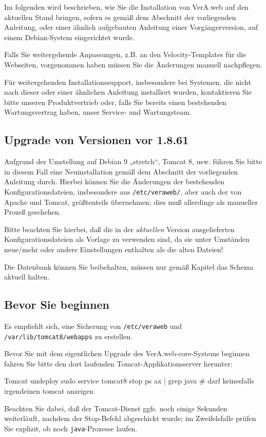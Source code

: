 \documentclass{tarentanleitung}
\begin{document}
Im folgenden wird beschrieben, wie Sie die Installation von VerA.web
auf den aktuellen Stand bringen, sofern es gemäß dem Abschnitt
 der vorliegenden Anleitung, oder einer ähnlich
aufgebauten Anleitung einer Vorgängerversion, auf einem Debian-System
eingerichtet wurde.

Falls Sie weitergehende Anpassungen, z.B. an den Velocity-Templates
für die Webseiten, vorgenommen haben müssen Sie die Änderungen
manuell nachpflegen.

Für weitergehenden Installationssupport, insbesondere bei Systemen,
die nicht nach dieser oder einer ähnlichen Anleitung installiert
wurden, kontaktieren Sie bitte unseren Produktvertrieb oder, falls
Sie bereits einen bestehenden Wartungsvertrag haben, unser Service-
und Wartungsteam.

\subsection{Upgrade von Versionen vor 1.8.61}\label{subsec:upgrade-core-before-monorepo}

Aufgrund der Umstellung auf Debian 9 „stretch“, Tomcat 8, usw.
führen Sie bitte in diesem Fall eine Neuinstallation gemäß dem
Abschnitt  der vorliegenden Anleitung
durch. Hierbei können Sie die Änderungen der bestehenden
Konfigurationsdateien, insbesondere aus \texttt{/etc/veraweb/},
aber auch der von Apache und Tomcat, größtenteils übernehmen;
dies muß allerdings als manueller Prozeß geschehen.

Bitte beachten Sie hierbei, daß die in der \emph{aktuellen}
Version ausgelieferten Konfigurationsdateien als Vorlage zu
verwenden sind, da sie unter Umständen neue/mehr oder andere
Einstellungen enthalten als die alten Dateien!

Die Datenbank können Sie beibehalten, müssen nur gemäß Kapitel
 das Schema aktuell halten.

\subsection{Bevor Sie beginnen}\label{subsec:upgrade-core-pre}

Es empfiehlt sich, eine Sicherung von \texttt{/etc/veraweb} und
\texttt{/var/lib/tomcat8/webapps} zu erstellen.

\begin{minipage}{\linewidth}
Bevor Sie mit dem eigentlichen Upgrade des VerA.web-core-Systems beginnen
fahren Sie bitte den dort laufenden Tomcat-Applikationsserver herunter:

\begin{lstdump}{Tomcat undeploy}
sudo service tomcat8 stop
ps ax | grep java               # darf keinesfalls irgendeinen tomcat anzeigen
\end{lstdump}

Beachten Sie dabei, daß der Tomcat-Dienst ggfs. noch einige Sekunden
weiterläuft, nachdem der Stop-Befehl abgeschickt wurde; im Zweifelsfalle
prüfen Sie explizit, ob noch \texttt{java}-Prozesse laufen.
\end{minipage}
\end{document}
